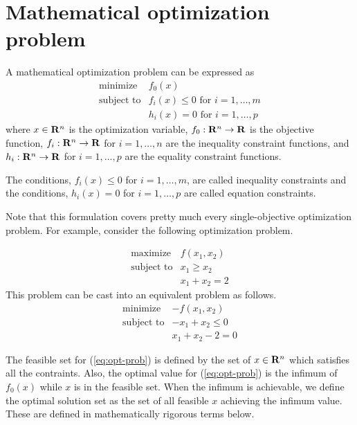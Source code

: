 \newcommand{\optdomain}{\mathcal{D}}

\section{Mathematical optimization problem}

A mathematical optimization problem can be expressed as
\begin{equation}
\label{eq:opt-prob}
\begin{array}{ll}
\mbox{minimize} & f_0(x)
\\
\mbox{subject to} & f_i(x) \leq 0 \mbox{ for } i = 1, \ldots, m
\\
& h_i(x) = 0 \mbox{ for } i = 1, \ldots, p
\end{array}
\end{equation}
where
$x\in\mathbf{R}^n$ is the optimization variable,
$f_0:\mathbf{R}^n\to\mathbf{R}$ is the objective function,
$f_i:\mathbf{R}^n\to\mathbf{R}$ for $i=1,\ldots,n$ are the inequality constraint functions,
and
$h_i:\mathbf{R}^n\to\mathbf{R}$ for $i=1,\ldots,p$ are the equality constraint functions.

The conditions, $f_i(x) \leq 0$ for $ i = 1, \ldots, m$, are called inequality constraints
and the conditions, $ h_i(x) = 0 $ for $ i = 1, \ldots, p$ are called equation constraints.

Note that this formulation covers pretty much every single-objective optimization problem.
For example,
consider the following optimization problem.

\begin{equation}
\begin{array}{ll}
\mbox{maximize} & f(x_1,x_2)
\\
\mbox{subject to} & x_1 \geq x_2
\\
& x_1 + x_2 = 2
\end{array}
\end{equation}
This problem can be cast into an equivalent problem as follows.
\begin{equation}
\begin{array}{ll}
\mbox{minimize} & -f(x_1,x_2)
\\
\mbox{subject to} & - x_1 + x_2 \leq 0
\\
& x_1 + x_2 - 2 = 0
\end{array}
\end{equation}


The feasible set for (\ref{eq:opt-prob}) is defined by the set of $x\in\mathbf{R}^n$ which satisfies all the contraints.
Also, the optimal value for (\ref{eq:opt-prob}) is the infimum of $f_0(x)$ while $x$ is in the feasible set.
When the infimum is achievable, we define the optimal solution set as the set of all feasible $x$ achieving
the infimum value.
These are defined in mathematically rigorous terms below.

